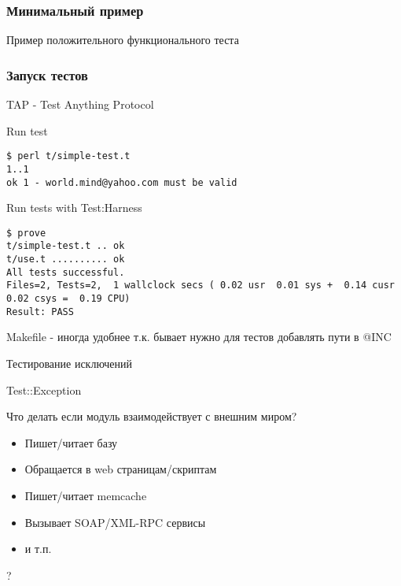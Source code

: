 \documentclass{beamer}
\begin{document}
\begin{frame}[fragile]
\frametitle{Минимальный пример}
\begin{block}{Пример положительного функционального теста}

\end{block}
\end{frame}

\begin{frame}[fragile]
\frametitle{Запуск тестов}
TAP - Test Anything Protocol
\begin{block}{Run test}
\begin{verbatim}
$ perl t/simple-test.t
1..1
ok 1 - world.mind@yahoo.com must be valid
\end{verbatim}
\end{block}
\begin{block}{Run tests with Test:Harness}
\begin{verbatim}
$ prove
t/simple-test.t .. ok   
t/use.t .......... ok   
All tests successful.
Files=2, Tests=2,  1 wallclock secs ( 0.02 usr  0.01 sys +  0.14 cusr  0.02 csys =  0.19 CPU)
Result: PASS
\end{verbatim}
\end{block}
Makefile - иногда удобнее т.к. бывает нужно для тестов добавлять пути в @INC
\end{frame}

\begin{frame}{Тестирование исключений}
\begin{block}{Test::Exception}

\end{block}
\end{frame}

\begin{frame}{Что делать если модуль взаимодействует с внешним миром?}
\begin{itemize}
\item Пишет/читает базу
\item Обращается в web страницам/скриптам
\item Пишет/читает memcache
\item Вызывает SOAP/XML-RPC сервисы
\item и т.п.
\end{itemize}
\begin{center} 
\LARGE ?
\end{center}
\end{frame}
\end{document}
